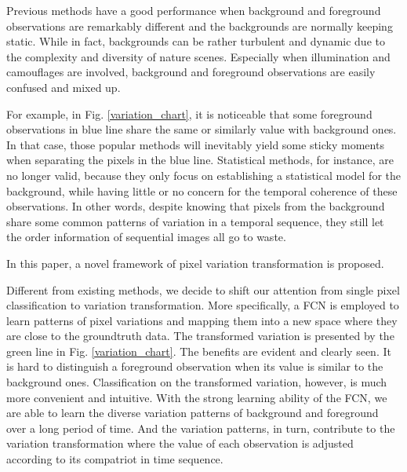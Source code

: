 \documentclass[journal]{IEEEtran}
\newcommand{\reffig}[1]{Fig. \ref{#1}}
\begin{document}

Previous methods have a good performance when background and foreground observations are remarkably different and the backgrounds are normally keeping static. 
While in fact, backgrounds can be rather turbulent and dynamic due to the complexity and diversity of nature scenes. 
Especially when illumination and camouflages are involved, background and foreground observations are easily confused and mixed up. 

For example, in \reffig{variation_chart}, it is noticeable that some foreground observations in blue line share the same or similarly value with background ones. 
In that case, those popular methods will inevitably yield some sticky moments when separating the pixels in the blue line. 
Statistical methods, for instance, are no longer valid, because they only focus on establishing a statistical model for the background, while having little or no concern for the temporal coherence of these observations. 
In other words, despite knowing that pixels from the background share some common patterns of variation in a temporal sequence, they still let the order information of sequential images all go to waste. 



In this paper, a novel framework of pixel variation transformation is proposed. %

Different from existing methods, we decide to shift our attention from single pixel classification to variation transformation.
More specifically, a FCN is employed to learn patterns of pixel variations and mapping them into a new space where they are close to the groundtruth data.
The transformed variation is presented by the green line in \reffig{variation_chart}. 
The benefits are evident and clearly seen. 
It is hard to distinguish a foreground observation when its value is similar to the background ones. 
Classification on the transformed variation, however, is much more convenient and intuitive. 
With the strong learning ability of the FCN, we are able to learn the diverse variation patterns of background and foreground over a long period of time.
And the variation patterns, in turn, contribute to the variation transformation where the value of each observation is adjusted according to its compatriot in time sequence.
\end{document}
